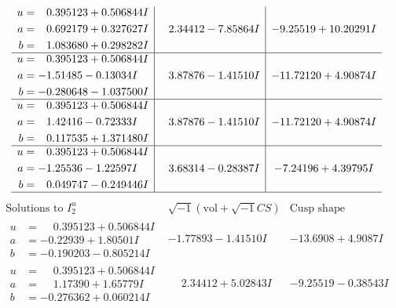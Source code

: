 \documentclass[1p]{elsarticle_modified}
\theoremstyle{definition}
\newcommand{\I}{\sqrt{-1}}
\begin{document}
$$\begin{array}{c|c|c}
\begin{aligned}
u &= \phantom{-}0.395123 + 0.506844 I \\
a &= \phantom{-}0.692179 + 0.327627 I \\
b &= \phantom{-}1.083680 + 0.298282 I\end{aligned}
 & \phantom{-}2.34412 - 7.85864 I & -9.25519 + 10.20291 I \\ \hline\begin{aligned}
u &= \phantom{-}0.395123 + 0.506844 I \\
a &= -1.51485 - 0.13034 I \\
b &= -0.280648 - 1.037500 I\end{aligned}
 & \phantom{-}3.87876 - 1.41510 I & -11.72120 + 4.90874 I \\ \hline\begin{aligned}
u &= \phantom{-}0.395123 + 0.506844 I \\
a &= \phantom{-}1.42416 - 0.72333 I \\
b &= \phantom{-}0.117535 + 1.371480 I\end{aligned}
 & \phantom{-}3.87876 - 1.41510 I & -11.72120 + 4.90874 I \\ \hline\begin{aligned}
u &= \phantom{-}0.395123 + 0.506844 I \\
a &= -1.25536 - 1.22597 I \\
b &= \phantom{-}0.049747 - 0.249446 I\end{aligned}
 & \phantom{-}3.68314 - 0.28387 I & -7.24196 + 4.39795 I\\
 \hline 
 \end{array}$$\newpage$$\begin{array}{c|c|c}  
\text{Solutions to }I^u_{2}& \I (\text{vol} + \sqrt{-1}CS) & \text{Cusp shape}\\
 \hline 
\begin{aligned}
u &= \phantom{-}0.395123 + 0.506844 I \\
a &= -0.22939 + 1.80501 I \\
b &= -0.190203 - 0.805214 I\end{aligned}
 & -1.77893 - 1.41510 I & -13.6908 + 4.9087 I \\ \hline\begin{aligned}
u &= \phantom{-}0.395123 + 0.506844 I \\
a &= \phantom{-}1.17390 + 1.65779 I \\
b &= -0.276362 + 0.060214 I\end{aligned}
 & \phantom{-}2.34412 + 5.02843 I & -9.25519 - 0.38543 I \\ \hline\begin{aligned}

\end{aligned}
\end{array}$$
\end{document}

